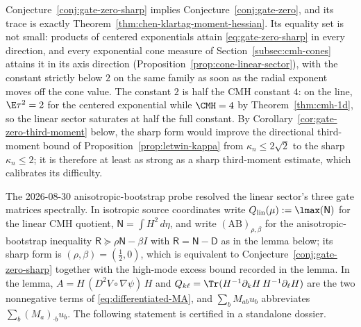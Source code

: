 \documentclass[../../main.tex]{subfiles}
\begin{document}
Conjecture~\ref{conj:gate-zero-sharp} implies Conjecture~\ref{conj:gate-zero}, and its trace
is exactly Theorem~\ref{thm:chen-klartag-moment-hessian}. Its equality set is not small:
products of centered exponentials attain \eqref{eq:gate-zero-sharp} in every direction, and
every exponential cone measure of Section~\ref{subsec:cmh-cones} attains it in its axis
direction (Proposition~\ref{prop:cone-linear-sector}), with the constant strictly below $2$
on the same family as soon as the radial exponent moves off the cone value. The constant $2$
is half the CMH constant $4$: on the line, $\E\tau^2=2$ for the centered exponential while
$\CMH=4$ by Theorem~\ref{thm:cmh-1d}, so the linear sector saturates at half the full
constant. By Corollary~\ref{cor:gate-zero-third-moment} below, the sharp form would improve
the directional third-moment bound of Proposition~\ref{prop:letwin-kappa} from
$\kappa_n\le2\sqrt2$ to the sharp $\kappa_n\le2$; it is therefore at least as strong as a
sharp third-moment estimate, which calibrates its difficulty.

The 2026-08-30 anisotropic-bootstrap probe resolved the linear sector's three gate matrices
spectrally. In isotropic source coordinates write $Q_{\rm lin}(\mu):=\lmax(\mathsf N)$ for the
linear CMH quotient, $\mathsf N=\int H^2\,d\eta$, and write $(\mathrm{AB})_{\rho,\beta}$ for
the anisotropic-bootstrap inequality $\mathsf R\succeq\rho\mathsf N-\beta I$ with
$\mathsf R=\mathsf N-\mathsf D$ as in the lemma below; its sharp form is $(\rho,\beta)=(\tfrac12,0)$,
which is equivalent to Conjecture~\ref{conj:gate-zero-sharp} together with the high-mode
excess bound recorded in the lemma. In the lemma, $A=H\,(D^2V\circ\nabla\psi)\,H$ and
$Q_{k\ell}=\Tr(H^{-1}\partial_kH\,H^{-1}\partial_\ell H)$ are the two nonnegative terms of
\eqref{eq:differentiated-MA}, and $\sum_bM_{ab}u_b$ abbreviates $\sum_b(M_a)_{\cdot b}u_b$.
The following statement is certified in a standalone dossier.
\end{document}
